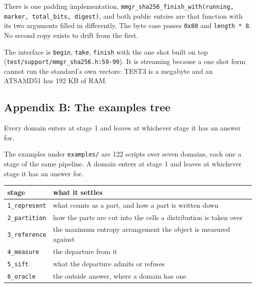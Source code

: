 There is one padding implementation, \texttt{mmgr\_\allowbreak{}sha256\_\allowbreak{}finish\_\allowbreak{}with(running, marker, total\_\allowbreak{}bits, digest)}, and both public entries are that function with its two arguments filled in differently. The byte case passes \texttt{0x80} and \texttt{length * 8}. No second copy exists to drift from the first.

The interface is \texttt{begin}, \texttt{take}, \texttt{finish} with the one shot built on top (\texttt{test/\allowbreak{}support/\allowbreak{}mmgr\_\allowbreak{}sha256.\allowbreak{}h:59-\allowbreak{}99}). It is streaming because a one shot form cannot run the standard's own vectors: TEST3 is a megabyte and an ATSAMD51 has 192 KB of RAM.

\subsection{Appendix B: The examples tree}

Every domain enters at stage 1 and leaves at whichever stage it has an answer for.

The examples under \texttt{examples/\allowbreak{}} are 122 scripts over seven domains, each one a
stage of the same pipeline. A domain enters at stage 1 and leaves at whichever stage it has an
answer for.

\begin{center}
\begin{tabular}{@{}>{\raggedright\arraybackslash}p{}>{\raggedright\arraybackslash}p{}@{}}
\toprule
stage & what it settles \\
\midrule
\texttt{1\_represent} & what counts as a part, and how a part is written down \\
\texttt{2\_partition}  & how the parts are cut into the cells a distribution is taken over \\
\texttt{3\_reference}  & the maximum entropy arrangement the object is measured against \\
\texttt{4\_measure}    & the departure from it \\
\texttt{5\_sift}       & what the departure admits or refuses \\
\texttt{6\_oracle}     & the outside answer, where a domain has one \\
\bottomrule
\end{tabular}
\end{center}

